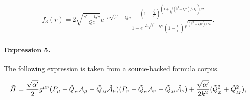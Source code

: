 \documentclass[11pt]{article}
\begin{document}
\begin{align*}f_3 (r) = 2 \sqrt{\frac{\bar{s}^2 - Qc}{Qc} } e^{- \tilde{c} \sqrt{\bar{s}^2 - Qc}}\frac{ \left( 1 - \frac{r_0^2}{r^2} \right)^{(1 + \sqrt{(\bar{s}^2 - Qc)/D_2} \ ) /2} } {1- e^{-2 \tilde{c} \sqrt{\bar{s}^2 - Qc}} \left( 1 - \frac{r_0^2}{r^2} \right)^{\sqrt{(\bar{s}^2 - Qc)/D_2}} } . \end{align*}

\paragraph{Expression 5.} The following expression is taken from a source-backed formula corpus.

\begin{align*}\tilde{H} = \frac{\sqrt{\alpha^\prime}}{2}g^{\mu \nu}(P_\mu - \tilde{Q}_{_{E}}{\cal A}_\mu - \tilde{Q}_{_{M}}\tilde{\cal A}_\mu)(P_\nu - \tilde{Q}_{_{E}}{\cal A}_\nu - \tilde{Q}_{_{M}}\tilde{\cal A}_\nu) + \frac{\sqrt{\alpha^\prime}}{2k^2}({\tilde{Q}_{_{E}}}^2 + {\tilde{Q}_{_{M}}}^2),\end{align*}
\end{document}
